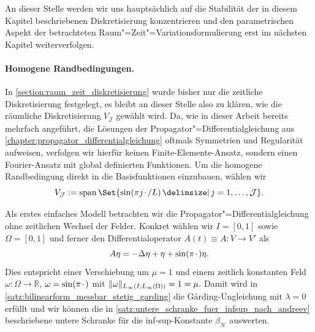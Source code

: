 \documentclass[../main.tex]{subfiles}
\begin{document}
An dieser Stelle werden wir uns hauptsächlich auf die Stabilität der in diesem Kapitel beschriebenen Diskretisierung konzentrieren und den parametrischen Aspekt der betrachteten Raum"=Zeit"=Variationsformulierung erst im nächsten Kapitel weiterverfolgen.

\paragraph{Homogene Randbedingungen.} %
\label{par:homogene_randbedingungen_}

In \cref{section:raum_zeit_diskretisierung} wurde bisher nur die zeitliche Diskretisierung festgelegt, es bleibt an dieser Stelle also zu klären, wie die räumliche Diskretisierung $V_{\mathcal J}$ gewählt wird.
Da, wie in dieser Arbeit bereits mehrfach angeführt, die Lösungen der Propagator"=Differentialgleichung aus \cref{chapter:propagator_differentialgleichung} oftmals Symmetrien und Regularität aufweisen, verfolgen wir hierfür keinen Finite-Elemente-Ansatz, sondern einen Fourier-Ansatz mit global definierten Funktionen.
Um die homogene Randbedingung direkt in die Basisfunktionen einzubauen, wählen wir
\begin{equation}
    V_{\mathcal J} := \spn \Set{ \sin(\pi j \blank / L) \given j = 1, \dots, \mathcal J}.
\end{equation}

Als erstes einfaches Modell betrachten wir die Propagator"=Differentialgleichung ohne zeitlichen Wechsel der Felder.
Konkret wählen wir $I = [0, 1]$ sowie $\Omega = [0, 1]$ und ferner den Differentialoperator $A(t) \equiv A \colon V \to V'$ als
\begin{equation}
    A \eta = - \Delta \eta + \eta + \sin(\pi {\mkern2mu\cdot\mkern2mu}) \eta.
\end{equation}
Dies entspricht einer Verschiebung um $\mu = 1$ und einem zeitlich konstanten Feld $\omega \colon \Omega \to \mathbb{R}$, $\omega = \sin(\pi {\mkern2mu\cdot\mkern2mu})$ mit $\lVert\omega\rVert_{L_{\infty}(I; L_{\infty}(\Omega))} = 1 = \mu$.
Damit wird in \cref{satz:bilinearform_messbar_stetig_garding} die G\aa{}rding-Ungleichung mit $\lambda = 0$ erfüllt und wir können die in \cref{satz:untere_schranke_fuer_infsup_nach_andreev} beschriebene untere Schranke für die inf-sup-Konstante $\beta_{\mathcal N}$ auswerten.
\end{document}
